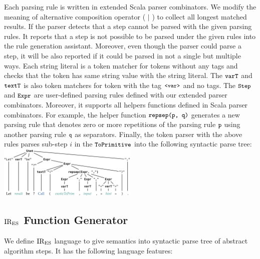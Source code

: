 Each parsing rule is written in extended Scala parser combinators.
We modify the meaning of alternative composition operator ( \( | \) ) to collect
all longest matched results. If the parser detects that a step cannot be
parsed with the given parsing rules. It reports that a step is not possible
to be parsed under the given rules into the rule generation assistant.
Moreover, even though the parser could parse a step, it will be also reported
if it could be parsed in not a single but multiple ways.
Each string literal is a token matcher for tokens without any tags and checks
that the token has same string value with the string literal.
The \( \texttt{\small varT} \) and \( \texttt{\small textT} \) is also token matchers
for token with the tag \( \texttt{\small<var>} \) and no tags.
The \( \texttt{\small Step} \) and \( \texttt{\small Expr} \) are user-defined parsing rules
defined with our extended parser combinators.
Moreover, it supports all helpers functions defined in Scala parser combinators.
For example, the helper function \( \texttt{\small repsep(p, q)} \) generates a new
parsing rule that denotes zero or more repetitions of the parsing rule \( \texttt{\small p} \)
using another parsing rule \( \texttt{\small q} \) as separators.
Finally, the token parser with the above rules parses sub-step \( i \) in the
\( \texttt{\small ToPrimitive} \) into the following syntactic parse tree:
\includegraphics[width=0.5\textwidth]{img/parse_tree.png}

\subsection{\( \text{IR}_\text{ES} \) Function Generator}

We define \( \text{IR}_\text{ES} \) language to give semantics into syntactic parse tree of
abstract algorithm steps. It has the following language features:

